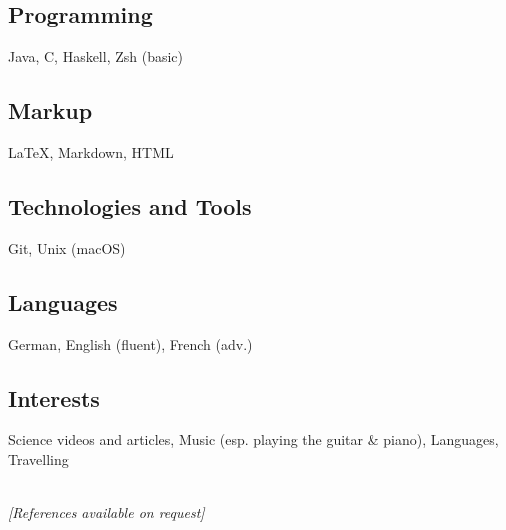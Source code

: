 \documentclass[]{jonas-cv}
\begin{document}
\begin{minipage}[t]{0.34\textwidth}



\subsection{Programming}
Java, C, Haskell, Zsh (basic)\\
\tinysectionsep

\subsection{Markup}
\LaTeX, Markdown, HTML\\
\tinysectionsep

\subsection{Technologies and Tools}
Git, Unix (macOS)\\
\tinysectionsep

\subsection{Languages}
German, English (fluent), French (adv.)

\largesectionsep

\subsection{Interests}
Science videos and articles, Music (esp. playing the guitar \& piano), Languages, Travelling

\ \\
\small \textit{[References available on request]}

%
%

\end{minipage} 
\hfill
\end{document}
